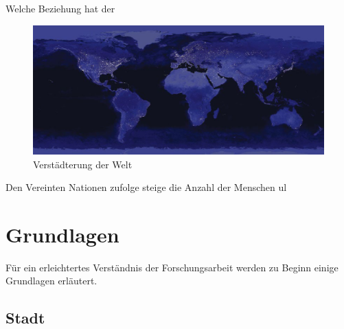 \documentclass{scrartcl}
\begin{document}
Welche Beziehung hat der 
\begin{figure}[htbp]
\centering
\includegraphics[width=14cm]{image_folder/sattelit_bild_welt.png}
\caption{Verstädterung der Welt}
\end{figure}

Den Vereinten Nationen zufolge steige die Anzahl der Menschen \acs{ul}





\section{Grundlagen}

Für ein erleichtertes Verständnis der Forschungsarbeit werden zu Beginn einige Grundlagen erläutert.

\subsection{Stadt}
\end{document}

